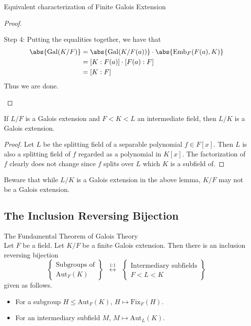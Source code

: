 \documentclass[a4paper]{article}
\begin{document}
\begin{prp}{Equivalent characterization of Finite Galois Extension}{}
\begin{proof}
\begin{itemize}
Step 4: Putting the equalities together, we have that 
\begin{align*}
\abs{\text{Gal}(K/F)}&=\abs{\text{Gal}(K/F(a))}\cdot\abs{\text{Emb}_F(F(a),K)}\\
&=[K:F(a)]\cdot[F(a):F]\\
&=[K:F]
\end{align*}
Thus we are done. 
\end{itemize}
\end{proof}
\end{prp}

\begin{lmm}{}{} If $L/F$ is a Galois extension and $F<K<L$ an intermediate field, then $L/K$ is a Galois extension. 
\begin{proof}
Let $L$ be the splitting field of a separable polynomial $f\in F[x]$. Then $L$ is also a splitting field of $f$ regarded as a polynomial in $K[x]$. The factorization of $f$ clearly does not change since $f$ splits over $L$ which $K$ is a subfield of. 
\end{proof}
\end{lmm}

Beware that while $L/K$ is a Galois extension in the above lemma, $K/F$ may not be a Galois extension. 

\subsection{The Inclusion Reversing Bijection}
\begin{thm}{The Fundamental Theorem of Galois Theory}{}\\
Let $F$ be a field. Let $K/F$ be a finite Galois extension. Then there is an inclusion reversing bijection $$\left\{\substack{\text{Subgroups of}\\\text{Aut}_F(K)}\right\}\;\;\overset{\text{1:1}}{\longleftrightarrow}\;\;\left\{\substack{\text{Intermediary subfields}\\ F<L<K}\right\}$$ given as follows. 
\begin{itemize}
\item For a subgroup $H\leq\text{Aut}_F(K)$, $H\mapsto\text{Fix}_F(H)$. 
\item For an intermediary subfield $M$, $M\mapsto\text{Aut}_L(K)$. 
\end{itemize}
\end{thm}
\end{document}
